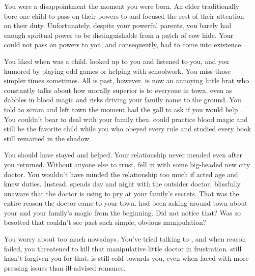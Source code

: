 \documentclass[char]{Pestilence}
\begin{document}
\name{\cApprentice{}}

You were a disappointment the moment you were born. An elder traditionally bore one child to pass on their powers to and focused the rest of their attention on their duty. Unfortunately, despite your powerful parents, you barely had enough spiritual power to be distinguishable from a patch of cow hide. Your \cElder{\parent} could not pass on \cElder{\their} powers to you, and consequently, \cRebel{} had to come into existence.

You liked \cRebel{} when \cRebel{\they} was a child. \cRebel{\They} looked up to you and listened to you, and you humored \cRebel{\them} by playing \cRebel{\their} odd games or helping with \cRebel{\their} schoolwork. You miss those simpler times sometimes. All is past, however. \cRebel{} is now an annoying little brat who constantly talks about how morally superior \cRebel{\they} is to everyone in town, even as \cRebel{\they} dabbles in blood magic and risks driving your family name to the ground. You told \cRebel{\them} to scram and left town the moment \cRebel{\they} had the gall to ask if you would help \cRebel{\them}. You couldn't bear to deal with your family then. \cRebel{} could practice blood magic and still be the favorite child while you who obeyed every rule and studied every book still remained in the shadow.

You should have stayed and helped. Your relationship never mended even after you returned. Without anyone else to trust, \cRebel{} fell in with some big-headed new city doctor. You wouldn't have minded the relationship too much if \cRebel{} acted \cRebel{\their} age and knew \cRebel{\their} duties. Instead, \cRebel{\they} spends day and night with the outsider doctor, blissfully unaware that the doctor is using \cRebel{\them} to pry at your family's secrets. That was the entire reason the doctor came to your town. \cOutsider{\They} had been asking around town about your \cElder{\parent} and your family's magic from the beginning. Did \cRebel{} not notice that? Was \cRebel{\they} so besotted that \cRebel{\they} couldn't see past such simple, obvious manipulation?

You worry about \cRebel{} too much nowadays. You've tried talking to \cRebel{\them}, and when reason failed, you threatened to kill that manipulative little doctor in frustration. \cRebel{} still hasn't forgiven you for that. \cRebel{\They} is still cold towards you, even when faced with more pressing issues than \cRebel{\their} ill-advised romance.
\end{document}
